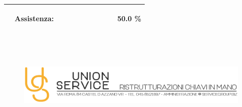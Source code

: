 \documentclass[a4paper]{article}
\begin{document}
\begin{tabular}{ | L{6.1mm} |  L{26mm} | L{11mm} |  L{9mm} | L{6.5mm} | L{6.5mm} | L{6.5mm} | L{6.5mm} | L{8mm} | L{7.7mm} | L{16mm} |  }
                        \vspace{2.5mm}\begin{spacing}{0}\end{spacing} &\vspace{2.5mm}\begin{spacing}{0}Assistenza: \newline \end{spacing} &\vspace{2.5mm}\begin{spacing}{0}\end{spacing} &\vspace{2.5mm}\begin{spacing}{0}\end{spacing} &\vspace{2.5mm}\begin{spacing}{0}\end{spacing} &\vspace{2.5mm}\begin{spacing}{0}\end{spacing} &\vspace{2.5mm}\begin{spacing}{0}\end{spacing} &\vspace{2.5mm}\begin{spacing}{0}\end{spacing} &\vspace{2.5mm}\begin{spacing}{0}\end{spacing} &\vspace{2.5mm}\begin{spacing}{0}\end{spacing} &\vspace{2.5mm}\begin{spacing}{0}50.0 \%
                            \end{spacing} \\ \hline %
    
                            \end{tabular} \\ \newpage
                                \begin{figure}[!t]
                                \includegraphics[width=15.8cm, height=3cm]{intestazioneAlta2.jpg}
                                \end{figure}
                                
\end{document}
